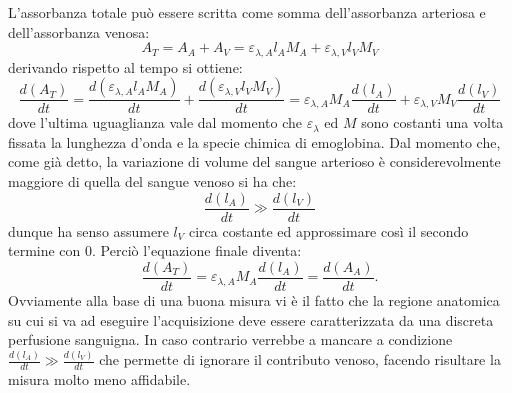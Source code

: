 \documentclass[a4paper, 12pt]{book}
\begin{document}
L'assorbanza totale può essere scritta come somma dell'assorbanza arteriosa e dell'assorbanza venosa:
\begin{equation*}
	A_T = A_A + A_V = \varepsilon_{\lambda,A}l_AM_A + \varepsilon_{\lambda,V}l_VM_V
\end{equation*}
derivando rispetto al tempo si ottiene:
\begin{equation*}
    \frac{d(A_T)}{dt} = \frac{d(\varepsilon_{\lambda,A}l_AM_A)}{dt} + 							\frac{d(\varepsilon_{\lambda,V}l_VM_V)}{dt} = \varepsilon_{\lambda,A}M_A					\frac{d(l_A)}{dt} + \varepsilon_{\lambda,V}M_V\frac{d(l_V)}{dt}
\end{equation*}
dove l'ultima uguaglianza vale dal momento che $\varepsilon_{\lambda}$ ed $M$ sono costanti una volta fissata la lunghezza d'onda e la specie chimica di emoglobina.
Dal momento che, come già detto, la variazione di volume del sangue arterioso è considerevolmente maggiore di quella del sangue venoso si ha che:
\begin{equation*}
    \frac{d(l_A)}{dt} \gg \frac{d(l_V)}{dt}
\end{equation*}
dunque ha senso assumere $l_V$ circa costante ed approssimare così il secondo termine con 0.
Perciò l'equazione finale diventa:
\begin{equation*}
    \frac{d(A_T)}{dt} = \varepsilon_{\lambda,A}M_A\frac{d(l_A)}{dt} = \frac{d(A_A)}				{dt}.
\end{equation*}
Ovviamente alla base di una buona misura vi è il fatto che la regione anatomica su cui si va ad eseguire l'acquisizione deve essere caratterizzata da una discreta perfusione sanguigna.
In caso contrario verrebbe a mancare a condizione $\frac{d(l_A)}{dt} \gg \frac{d(l_V)}{dt}$ che permette di ignorare il contributo venoso, facendo risultare la misura molto meno affidabile.
\end{document}
